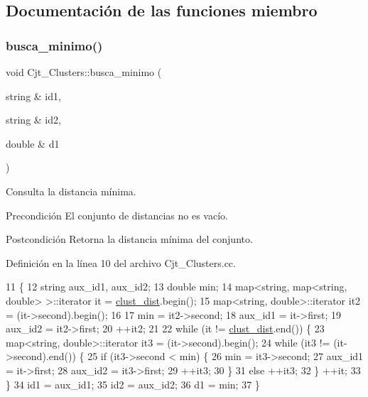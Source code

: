 \subsection{Documentación de las funciones miembro}
\mbox{\label{class_cjt___clusters_afc180c4e851b321837f6d2c173916e57}} 
\subsubsection{\texorpdfstring{busca\+\_\+minimo()}{busca\_minimo()}}
{\footnotesize\ttfamily void Cjt\+\_\+\+Clusters\+::busca\+\_\+minimo (\begin{DoxyParamCaption}\item[{string \&}]{id1,  }\item[{string \&}]{id2,  }\item[{double \&}]{d1 }\end{DoxyParamCaption})}



Consulta la distancia mínima. 

\begin{DoxyPrecond}{Precondición}
El conjunto de distancias no es vacío. 
\end{DoxyPrecond}
\begin{DoxyPostcond}{Postcondición}
Retorna la distancia mínima del conjunto. 
\end{DoxyPostcond}


Definición en la línea 10 del archivo Cjt\+\_\+\+Clusters.\+cc.


\begin{DoxyCode}
11 \{
12     \textcolor{keywordtype}{string} aux\_id1, aux\_id2;
13     \textcolor{keywordtype}{double} min;
14     map<string, map<string, double> >::iterator it = \hyperlink{class_cjt___clusters_a2e0931084578a4abb26d17bf289628d2}{clust\_dist}.begin();
15     map<string, double>::iterator it2 = (it->second).begin();
16 
17     min = it2->second;
18     aux\_id1 = it->first;
19     aux\_id2 = it2->first;
20     ++it2;
21 
22     \textcolor{keywordflow}{while} (it != \hyperlink{class_cjt___clusters_a2e0931084578a4abb26d17bf289628d2}{clust\_dist}.end()) \{
23         map<string, double>::iterator it3 = (it->second).begin();
24         \textcolor{keywordflow}{while} (it3 != (it->second).end()) \{
25             \textcolor{keywordflow}{if} (it3->second < min) \{
26                 min = it3->second;
27                 aux\_id1 = it->first;
28                 aux\_id2 = it3->first;
29                 ++it3;
30             \}
31             \textcolor{keywordflow}{else} ++it3;
32         \} ++it;
33     \}
34     id1 = aux\_id1;
35     id2 = aux\_id2;
36     d1 = min;
37 \}
\end{DoxyCode}
\mbox{\label{class_cjt___clusters_adf61aa25dfe16d52c5453d048df5efff}} 
